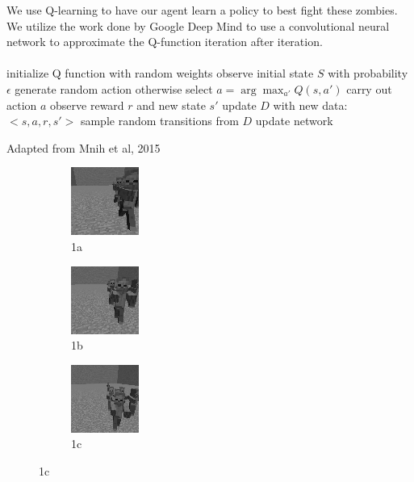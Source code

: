 \documentclass{article}
\begin{document}
\begin{multicols}{2}
We use Q-learning to have our agent learn a policy to best fight these zombies.
We utilize the work done by Google Deep Mind to use a convolutional neural network to approximate the Q-function iteration after iteration.
\paragraph{}


\begin{algorithm*}[H]
     \SetAlgoLined
     initialize Q function with random weights \;
     observe initial state $S$ \;
      {
        with probability $\epsilon$ generate random action \;
        otherwise select $a = \arg\max_{a'} Q(s,a')$ \;
        carry out action $a$ \;
        observe reward $r$ and new state $s'$ \;
        update $D$ with new data: $<s,a,r,s'>$ \;
        sample random transitions from $D$ \;
        update network \;
     }
     \caption{Adapted from Mnih et al, 2015}
\end{algorithm*}

\begin{figure}[H]
\caption{Images of processed features}
\begin{subfigure}{.25\textwidth}
  \centering
  \includegraphics[scale=1.0]{./messigray1.png}
  \caption{1a}
  \label{fig:sfig1}
\end{subfigure}%
\begin{subfigure}{.25\textwidth}
  \centering
  \includegraphics[scale=1.0]{./messigray2.png}
  \caption{1b}
  \label{fig:sfig2}
\end{subfigure}
\begin{subfigure}{.25\textwidth}
  \centering
  \includegraphics[scale=1.0]{./messigray3.png}
  \caption{1c}
  \label{fig:sfig3}
\end{subfigure}
\label{fig:fig}
\end{figure}




\end{multicols}
\end{document}
